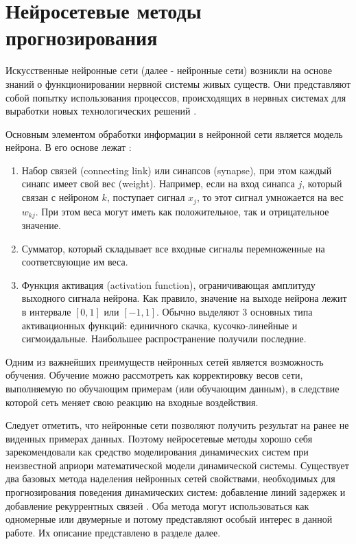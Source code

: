 \documentclass[a4paper,14pt,russian]{extreport}
\begin{document}
\section{Нейросетевые методы прогнозирования}
Искусственные нейронные сети (далее - нейронные сети) возникли на основе 
знаний о функционировании нервной системы живых существ. Они 
представляют собой попытку использования процессов, происходящих в 
нервных системах для выработки новых технологических решений 
\cite{osovskiy2002}. 

Основным элементом обработки информации в нейронной сети является модель 
нейрона. В его основе лежат \cite{haykin1999}:
\begin{enumerate}
	\item Набор связей (connecting link) или синапсов (synapse), при этом 
		каждый синапс имеет свой вес (weight). Например, если на вход 
		синапса $j$, который связан с нейроном $k$, поступает сигнал $x_j$, то 
		этот сигнал умножается на вес $w_{k j}$. При этом веса могут иметь
		как положительное, так и отрицательное значение.
	\item Сумматор, который складывает все входные сигналы перемноженные 
		на соответсвующие им веса.
	\item Функция активация (activation function), ограничивающая амплитуду 
		выходного сигнала нейрона. Как правило, значение на выходе нейрона 
		лежит в интервале $[0, 1]$ или $[-1, 1]$. Обычно выделяют 3 основных 
		типа активационных функций: единичного скачка, кусочко-линейные и 
		сигмоидальные. Наибольшее распространение получили последние.
\end{enumerate}

Одним из важнейших преимуществ нейронных сетей является возможность 
обучения. Обучение можно рассмотреть как корректировку весов сети, 
выполняемую по обучающим примерам (или обучающим данным), в следствие 
которой сеть меняет свою реакцию на входные воздействия.

Следует отметить, что нейронные сети позволяют получить результат на ранее 
не виденных примерах данных. Поэтому нейросетевые методы хорошо себя 
зарекомендовали как средство моделирования динамических систем при 
неизвестной априори математической модели динамической системы. 
Существует два базовых метода наделения нейронных сетей свойствами, 
необходимых для прогнозирования поведения динамических систем: 
добавление линий задержек и добавление рекуррентных связей
\cite{chernodub2012}. Оба метода могут использоваться как одномерные или 
двумерные и потому представляют особый интерес в данной работе. Их 
описание представлено в разделе далее.
\end{document}
